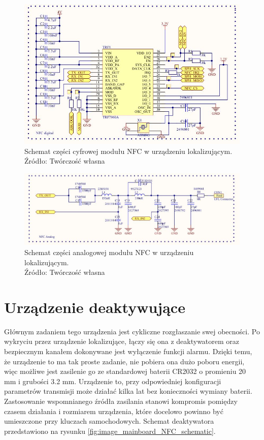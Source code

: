 \begin{figure}[H]
	\centering
	\includegraphics[width=15cm]{img/schematics/mainboard_NFC_chip.jpg}
	\caption{Schemat części cyfrowej modułu NFC w urządzeniu lokalizującym. \\ Źródło: Twórczość własna}
	\label{fig:image_mainboard_NFC_digital}
\end{figure}

\begin{figure}[H]
	\centering
	\includegraphics[width=15cm]{img/schematics/mainboard_NFC_analog.jpg}
	\caption{Schemat części analogowej modułu NFC w urządzeniu lokalizującym. \\ Źródło: Twórczość własna}
	\label{fig:image_mainboard_NFC_analog}
\end{figure}


\clearpage
\section{Urządzenie deaktywujące}

Głównym zadaniem tego urządzenia jest cykliczne rozgłaszanie swej obecności. Po wykryciu przez urządzenie lokalizujące, łączy się ona z deaktywatorem oraz bezpiecznym kanałem dokonywane jest wyłączenie funkcji alarmu. Dzięki temu, że urządzenie to ma tak proste zadanie, nie pobiera ona dużo poboru energii, więc możliwe jest zasilenie go ze standardowej baterii CR2032 o promieniu 20 mm i grubości 3.2 mm. Urządzenie to, przy odpowiedniej konfiguracji parametrów transmisji może działać kilka lat bez konieczności wymiany baterii. Zastosowanie wspomnianego źródła zasilania stanowi kompromis pomiędzy czasem działania i rozmiarem urządzenia, które docelowo powinno być umieszczone przy kluczach samochodowych. Schemat deaktywatora przedstawiono na rysunku \ref{fig:image_mainboard_NFC_schematic}.

